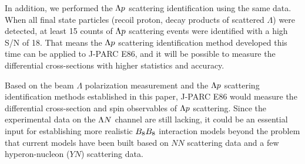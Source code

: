 In addition, we performed the $\Lambda p$ scattering identification using the same data. When all final state particles (recoil proton, decay products of scattered $\Lambda$) were detected, at least 15 counts of $\Lambda p$ scattering events were identified with a high S/N of 18. That means the $\Lambda p$ scattering identification method developed this time can be applied to J-PARC E86, and it will be possible to measure the differential cross-sections with higher statistics and accuracy.

Based on the beam $\Lambda$ polarization measurement and the $\Lambda p$ scattering identification methods established in this paper, J-PARC E86 would measure the differential cross-section and spin observables of $\Lambda p$ scattering. Since the experimental data on the $\Lambda N$ channel are still lacking, it could be an essential input for establishing more realistic $B_{8}B_{8}$ interaction models beyond the problem that current models have been built based on $NN$ scattering data and a few hyperon-nucleon ($YN$) scattering data. 


%
